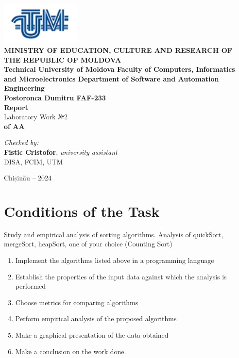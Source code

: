 \documentclass[12pt]{article}
\begin{document}
\begin{titlepage}
\begin{center}
    \includegraphics[width=0.3\textwidth]{image.png} \\[0.2cm]
    
    \textbf{MINISTRY OF EDUCATION, CULTURE AND RESEARCH 
OF THE REPUBLIC OF MOLDOVA} \\[0.3cm]
    
    \textbf{Technical University of Moldova 
Faculty of Computers, Informatics and Microelectronics 
Department of Software and Automation Engineering} \\[2cm]
    
    \textbf{Postoronca Dumitru FAF-233}\\[0.5cm]
    
    \Huge \textbf{Report} \\[0.5cm]
    
    \large Laboratory Work №2\\[0.5cm]
    
    \textbf{of AA} \\[3cm]
    
    \begin{flushright}
        \textit{Checked by:} \\
        \textbf{Fistic Cristofor}, \textit{university assistant} \\
        DISA, FCIM, UTM
    \end{flushright}
    
    \vfill
    
    Chișinău -- 2024
\end{center}
\end{titlepage}


\newpage
\setcounter{page}{1}
\pagestyle{fancy}
\fancyhf{}
\rhead{\thepage}

\section*{Conditions of the Task}
Study and empirical analysis of sorting algorithms. Analysis of quickSort, mergeSort, heapSort, one of your choice (Counting Sort)
\begin{enumerate}
    \item Implement the algorithms listed above in a programming language
    \item Establish the properties of the input data against which the analysis is performed
    \item Choose metrics for comparing algorithms
    \item Perform empirical analysis of the proposed algorithms
    \item Make a graphical presentation of the data obtained
    \item Make a conclusion on the work done.
\end{enumerate}
\end{document}
